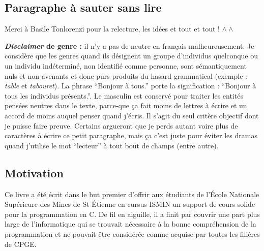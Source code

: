\documentclass[../main.tex]{subfiles}
\begin{document}
\subsection*{Paragraphe à sauter sans lire}
Merci à Basile Tonlorenzi pour la relecture, les idées et tout et tout ! $\wedge\wedge$

\textbf{\textit{Disclaimer} de genre  :} il n'y a pas de neutre en français malheureusement. Je considère que les genres quand ils désignent un groupe d'individus quelconque ou un individu indéterminé, non identifié comme personne, sont sémantiquement nuls et non avenants et donc purs produits du hasard grammatical (exemple : \textit{table} et \textit{tabouret}). La phrase ``Bonjour à tous.'' porte la signification : ``Bonjour à tous les individus présents.''. Le masculin est conservé pour traiter les entités pensées neutres dans le texte, parce-que ça fait moins de lettres à écrire et un accord de moins auquel penser quand j'écris. Il s'agit du seul critère objectif dont je puisse faire preuve. Certains argueront que je perds autant voire plus de caractères à écrire ce petit paragraphe, mais ça c'est juste pour éviter les dramas quand j'utilise le mot ``lecteur'' à tout bout de champs (entre autre).

\subsection*{Motivation}
Ce livre a été écrit dans le but premier d'offrir aux étudiants de l'École Nationale Supérieure des
Mines de St-Étienne en cursus ISMIN un support de cours solide pour la programmation en C. De fil
en aiguille, il a finit par couvrir une part plus large de l'informatique qui se trouvait nécessaire à la
bonne compréhension de la programmation et ne pouvait être considérée comme acquise par toutes les
filières de CPGE.
\end{document}
